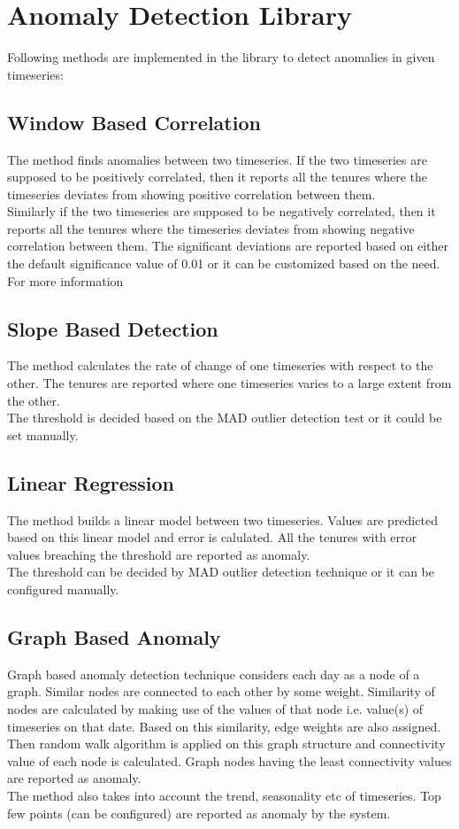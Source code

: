 \section{Anomaly Detection Library}
Following methods are implemented in the library to detect anomalies in given timeseries:
\subsection{Window Based Correlation}
The method finds anomalies between two timeseries. If the two timeseries are supposed to be positively correlated, then it reports all the tenures where the timeseries deviates from showing positive correlation between them.
\\
Similarly if the two timeseries are supposed to be negatively correlated, then it reports all the tenures where the timeseries deviates from showing negative correlation between them. The significant deviations are reported based on either the default significance value of 0.01 or it can be customized based on the need. For more information 
\subsection{Slope Based Detection}
The  method calculates the rate of change of one timeseries with respect to the other. The tenures are reported where one timeseries varies to a large extent from the other.
\\
The threshold is decided based on the MAD outlier detection test or it could be set manually.
\subsection{Linear Regression}
The method builds a linear model between two timeseries. Values are predicted based on this linear model and error is calulated. All the tenures with error values breaching the threshold are reported as anomaly. 
\\
The threshold can be decided by MAD outlier detection technique or it can be configured manually.
\subsection{Graph Based Anomaly}
Graph based anomaly detection technique considers each day as a node of a graph. Similar nodes are connected to each other by some weight. Similarity of nodes are calculated by making use of the values of that node i.e. value(s) of timeseries on that date. Based on this similarity, edge weights are also assigned. Then random walk algorithm is applied on this graph structure and connectivity value of each node is calculated. Graph nodes having the least connectivity values are reported as anomaly.
\\
The method also takes into account the trend, seasonality etc of timeseries. Top few points (can be configured) are reported as anomaly by the system.
